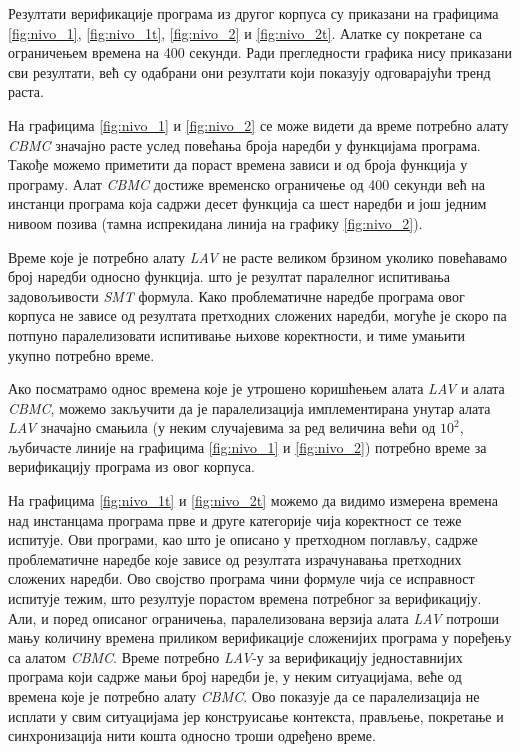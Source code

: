 \documentclass[12pt,oneside]{memoir}
\begin{document}
  Резултати верификације програма из другог корпуса су приказани на графицима \ref{fig:nivo_1}, \ref{fig:nivo_1t}, \ref{fig:nivo_2} и \ref{fig:nivo_2t}. Алатке су покретане са ограничењем времена на 400 секунди. Ради прегледности графика нису приказани сви резултати, већ су одабрани они резултати који показују одговарајући тренд раста.
  
  На графицима \ref{fig:nivo_1} и \ref{fig:nivo_2} се може видети да време потребно алату \textit{CBMC} значајно расте услед повећања броја наредби у функцијама програма.  Такође можемо приметити да пораст времена зависи и од броја функција у програму. Алат \textit{CBMC} достиже временско ограничење од 400 секунди већ на инстанци програма која садржи десет функција са шест наредби и још једним нивоом позива (тамна испрекидана линија на графику \ref{fig:nivo_2}). 
  
  Време које је потребно алату \textit{LAV} не расте великом брзином уколико повећавамо број наредби односно функција. што је резултат паралелног испитивања задовољивости \textit{SMT} формула. Како проблематичне наредбе програма овог корпуса не зависе од резултата претходних сложених наредби, могуће је скоро па потпуно паралелизовати испитивање њихове коректности, и тиме умањити укупно потребно време. 
  
  Ако посматрамо однос времена које је утрошено коришћењем алата \textit{LAV} и алата \textit{CBMC}, можемо закључити да је паралелизација имплементирана унутар алата \textit{LAV} значајно смањила (у неким случајевима за ред величина већи од $ 10^{2} $, љубичасте линије на графицима \ref{fig:nivo_1} и \ref{fig:nivo_2}) потребно време за верификацију програма из овог корпуса.
  
  На графицима \ref{fig:nivo_1t} и \ref{fig:nivo_2t} можемо да видимо измерена времена над инстанцама програма прве и друге категорије чија коректност се теже испитује. Ови програми, као што је описано у претходном поглављу, садрже проблематичне наредбе које зависе од резултата израчунавања претходних сложених наредби. Ово својство програма чини формуле чија се исправност испитује тежим, што резултује порастом времена потребног за верификацију. Али, и поред описаног ограничења, паралелизована верзија алата \textit{LAV} потроши мању количину времена приликом верификације сложенијих програма у поређењу са алатом \textit{CBMC}. Време потребно \textit{LAV}-у за верификацију једноставнијих програма који садрже мањи број наредби је, у неким ситуацијама, веће од времена које је потребно алату \textit{CBMC}. Ово показује да се паралелизација не исплати у свим ситуацијама јер конструисање контекста, прављење, покретање и синхронизација нити кошта односно троши одређено време.  
  
\end{document}
